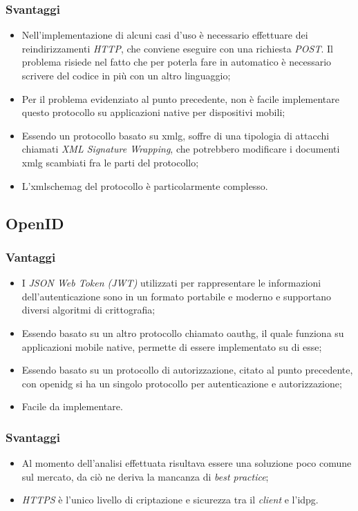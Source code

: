     \subsubsection{Svantaggi}\label{sec:saml_svantaggi}
    \begin{itemize}
        \item Nell'implementazione di alcuni casi d'uso è necessario effettuare dei reindirizzamenti \textit{HTTP}, che conviene eseguire con una richiesta \textit{POST}. Il problema risiede nel fatto che per poterla fare in automatico è necessario scrivere del codice in più con un altro linguaggio;
        \item Per il problema evidenziato al punto precedente, non è facile implementare questo protocollo su applicazioni native per dispositivi mobili;
        \item Essendo un protocollo basato su \gls{xmlg}, soffre di una tipologia di attacchi chiamati \textit{XML Signature Wrapping}, che potrebbero modificare i documenti \gls{xmlg} scambiati fra le parti del protocollo;
        \item L'\gls{xmlschemag} del protocollo è particolarmente complesso.
    \end{itemize}

\subsection{OpenID}
    \subsubsection{Vantaggi}
    \begin{itemize}
        \setlength\itemsep{0em}
        \item I \textit{JSON Web Token (JWT)} utilizzati per rappresentare le informazioni dell'autenticazione sono in un formato portabile e moderno e supportano diversi algoritmi di crittografia;
        \item Essendo basato su un altro protocollo chiamato \gls{oauthg}, il quale funziona su applicazioni mobile native, permette di essere implementato su di esse;
        \item Essendo basato su un protocollo di autorizzazione, citato al punto precedente, con \gls{openidg} si ha un singolo protocollo per autenticazione e autorizzazione;
        \item Facile da implementare.
    \end{itemize}
    \subsubsection{Svantaggi}
    \begin{itemize}
        \setlength\itemsep{0em}
        \item Al momento dell'analisi effettuata risultava essere una soluzione poco comune sul mercato, da ciò ne deriva la mancanza di \textit{best practice};
        \item \textit{HTTPS} è l'unico livello di criptazione e sicurezza tra il \textit{client} e l'\gls{idpg}.
    \end{itemize}

